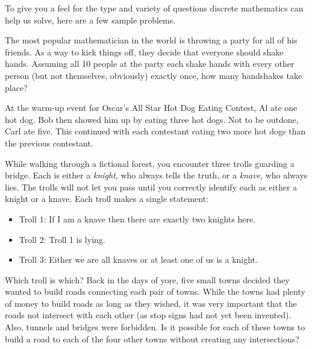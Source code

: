 \documentclass[11pt]{exam}
\begin{document}
To give you a feel for the type and variety of questions discrete mathematics can help us solve, here are a few sample problems.
\begin{questions}

\question The most popular mathematician in the world is throwing a party for all of his friends.  As a way to kick things off, they decide that everyone should shake hands.  Assuming all 10 people at the party each shake hands with every other person (but not themselves, obviously) exactly once, how many handshakes take place?

\vfill
\vfill

  \question At the warm-up event for Oscar's All Star Hot Dog Eating Contest, Al ate one hot dog.  Bob then showed him up by eating three hot dogs.  Not to be outdone, Carl ate five.  This continued with each contestant eating two more hot dogs than the previous contestant.

\vfill
\clearpage
  \question While walking through a fictional forest, you encounter three trolls guarding a bridge.  Each is either a {\em knight}, who always tells the truth, or a {\em knave}, who always lies.  The trolls will not let you pass until you correctly identify each as either a knight or a knave.  Each troll makes a single statement:
  \begin{itemize}
   \item[] Troll 1: If I am a knave then there are exactly two knights here.
   \item[] Troll 2: Troll 1 is lying.
   \item[] Troll 3: Either we are all knaves or at least one of us is a knight.
  \end{itemize}
  Which troll is which?
\vfill
  \question Back in the days of yore, five small towns decided they wanted to build roads connecting each pair of towns. While the towns had plenty of money to build roads as long as they wished, it was very important that the roads not intersect with each other (as stop signs had not yet been invented). Also, tunnels and bridges were forbidden. Is it possible for each of these towns to build a road to each of the four other towns without creating any intersections?



\end{questions}
\end{document}
